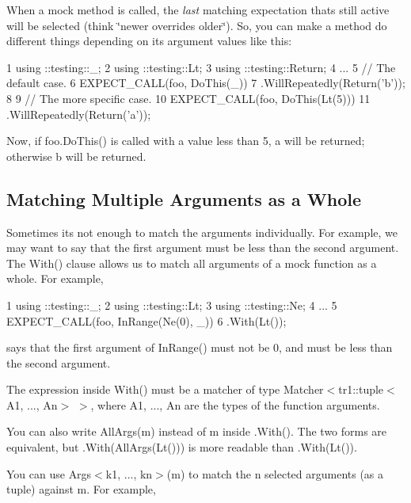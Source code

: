 When a mock method is called, the {\itshape last} matching expectation that\textquotesingle{}s still active will be selected (think \char`\"{}newer overrides older\char`\"{}). So, you can make a method do different things depending on its argument values like this\+:


\begin{DoxyCode}
1 using ::testing::\_;
2 using ::testing::Lt;
3 using ::testing::Return;
4 ...
5   // The default case.
6   EXPECT\_CALL(foo, DoThis(\_))
7       .WillRepeatedly(Return('b'));
8 
9   // The more specific case.
10   EXPECT\_CALL(foo, DoThis(Lt(5)))
11       .WillRepeatedly(Return('a'));
\end{DoxyCode}


Now, if {\ttfamily foo.\+Do\+This()} is called with a value less than 5, {\ttfamily \textquotesingle{}a\textquotesingle{}} will be returned; otherwise {\ttfamily \textquotesingle{}b\textquotesingle{}} will be returned.

\subsection*{Matching Multiple Arguments as a Whole}

Sometimes it\textquotesingle{}s not enough to match the arguments individually. For example, we may want to say that the first argument must be less than the second argument. The {\ttfamily With()} clause allows us to match all arguments of a mock function as a whole. For example,


\begin{DoxyCode}
1 using ::testing::\_;
2 using ::testing::Lt;
3 using ::testing::Ne;
4 ...
5   EXPECT\_CALL(foo, InRange(Ne(0), \_))
6       .With(Lt());
\end{DoxyCode}


says that the first argument of {\ttfamily In\+Range()} must not be 0, and must be less than the second argument.

The expression inside {\ttfamily With()} must be a matcher of type {\ttfamily Matcher$<$tr1\+::tuple$<$A1, ..., An$>$ $>$}, where {\ttfamily A1}, ..., {\ttfamily An} are the types of the function arguments.

You can also write {\ttfamily All\+Args(m)} instead of {\ttfamily m} inside {\ttfamily .With()}. The two forms are equivalent, but {\ttfamily .With(All\+Args(\+Lt()))} is more readable than {\ttfamily .With(\+Lt())}.

You can use {\ttfamily Args$<$k1, ..., kn$>$(m)} to match the {\ttfamily n} selected arguments (as a tuple) against {\ttfamily m}. For example,


